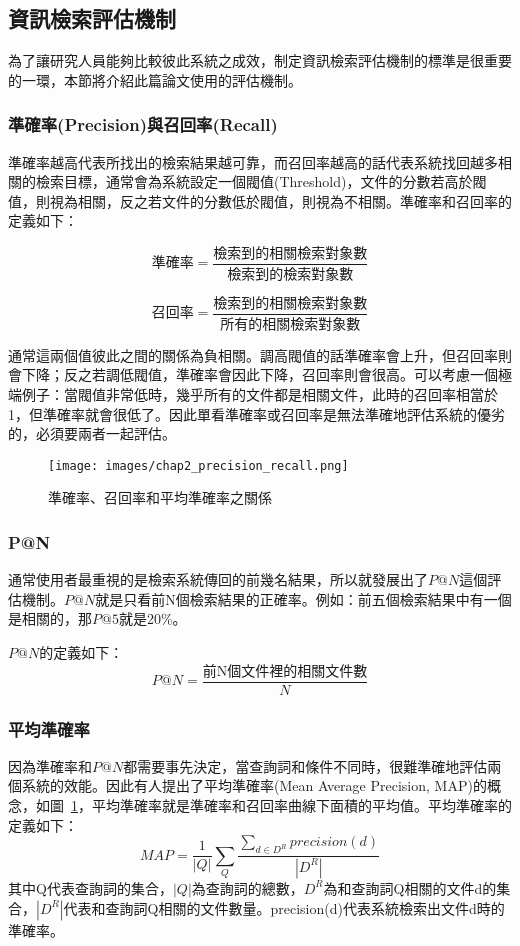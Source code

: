 \subsection{資訊檢索評估機制}
為了讓研究人員能夠比較彼此系統之成效，制定資訊檢索評估機制的標準是很重要的一環，本節將介紹此篇論文使用的評估機制。

\subsubsection{準確率(Precision)與召回率(Recall)}

準確率越高代表所找出的檢索結果越可靠，而召回率越高的話代表系統找回越多相關的檢索目標，通常會為系統設定一個閥值(Threshold)，文件的分數若高於閥值，則視為相關，反之若文件的分數低於閥值，則視為不相關。準確率和召回率的定義如下：

\[
\text{準確率}=\frac{\text{檢索到的相關檢索對象數}}{\text{檢索到的檢索對象數}}
\]

\[
\text{召回率}=\frac{\text{檢索到的相關檢索對象數}}{\text{所有的相關檢索對象數}}
\]

通常這兩個值彼此之間的關係為負相關。調高閥值的話準確率會上升，但召回率則會下降；反之若調低閥值，準確率會因此下降，召回率則會很高。可以考慮一個極端例子：當閥值非常低時，幾乎所有的文件都是相關文件，此時的召回率相當於1，但準確率就會很低了。因此單看準確率或召回率是無法準確地評估系統的優劣的，必須要兩者一起評估。

\begin{figure}
\centering
\texttt{[image: images/chap2\_precision\_recall.png]}
\caption{準確率、召回率和平均準確率之關係} \label{fig:precision_recall}
\end{figure}

\subsubsection{P@N}

通常使用者最重視的是檢索系統傳回的前幾名結果，所以就發展出了$P@N$這個評估機制。$P@N$就是只看前N個檢索結果的正確率。例如：前五個檢索結果中有一個是相關的，那$P@5$就是20\%。

$P@N$的定義如下：
\[
P@N=\frac{\text{前N個文件裡的相關文件數}}{N}
\]

\subsubsection{平均準確率~\cite{garofolo2000trec}}

因為準確率和$P@N$都需要事先決定，當查詢詞和條件不同時，很難準確地評估兩個系統的效能。因此有人提出了平均準確率(Mean Average Precision, MAP)的概念，如圖~\ref{fig:precision_recall}，平均準確率就是準確率和召回率曲線下面積的平均值。平均準確率的定義如下：
\begin{equation}
MAP = \frac{1}{|Q|} \sum_Q \frac{\sum_{d \in D^R}precision(d)}{|D^R|}
\end{equation}
其中Q代表查詢詞的集合，$|Q|$為查詢詞的總數，$D^R$為和查詢詞Q相關的文件d的集合，$|D^R|$代表和查詢詞Q相關的文件數量。precision(d)代表系統檢索出文件d時的準確率。

